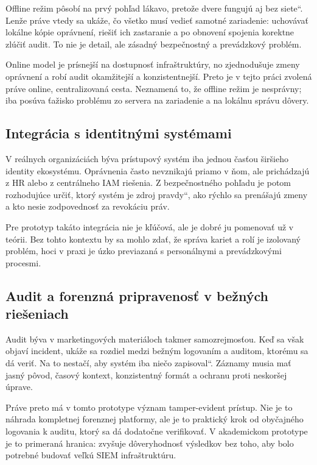 \documentclass[journal,a4paper,onecolumn]{IEEEtran}
\newcommand{\uv}[1]{\quotedblbase#1\textquotedblleft}
\begin{document}
Offline režim pôsobí na prvý pohľad lákavo, pretože dvere \uv{fungujú aj bez siete}. Lenže práve vtedy sa ukáže, čo všetko musí vedieť samotné zariadenie: uchovávať lokálne kópie oprávnení, riešiť ich zastaranie a po obnovení spojenia korektne zlúčiť audit. To nie je detail, ale zásadný bezpečnostný a prevádzkový problém.

Online model je prísnejší na dostupnosť infraštruktúry, no zjednodušuje zmeny oprávnení a robí audit okamžitejší a konzistentnejší. Preto je v tejto práci zvolená práve online, centralizovaná cesta. Neznamená to, že offline režim je nesprávny; iba posúva ťažisko problému zo servera na zariadenie a na lokálnu správu dôvery.

\subsection{Integrácia s identitnými systémami}

V reálnych organizáciách býva prístupový systém iba jednou časťou širšieho identity ekosystému. Oprávnenia často nevznikajú priamo v ňom, ale prichádzajú z HR alebo z centrálneho IAM riešenia. Z bezpečnostného pohľadu je potom rozhodujúce určiť, ktorý systém je \uv{zdroj pravdy}, ako rýchlo sa prenášajú zmeny a kto nesie zodpovednosť za revokáciu práv.

Pre prototyp takáto integrácia nie je kľúčová, ale je dobré ju pomenovať už v teórii. Bez tohto kontextu by sa mohlo zdať, že správa kariet a rolí je izolovaný problém, hoci v praxi je úzko previazaná s personálnymi a prevádzkovými procesmi.

\subsection{Audit a forenzná pripravenosť v bežných riešeniach}

Audit býva v marketingových materiáloch takmer samozrejmosťou. Keď sa však objaví incident, ukáže sa rozdiel medzi bežným logovaním a auditom, ktorému sa dá veriť. Na to nestačí, aby systém iba \uv{niečo zapisoval}. Záznamy musia mať jasný pôvod, časový kontext, konzistentný formát a ochranu proti neskoršej úprave.

Práve preto má v tomto prototype význam tamper-evident prístup. Nie je to náhrada kompletnej forenznej platformy, ale je to praktický krok od obyčajného logovania k auditu, ktorý sa dá dodatočne verifikovať. V akademickom prototype je to primeraná hranica: zvyšuje dôveryhodnosť výsledkov bez toho, aby bolo potrebné budovať veľkú SIEM infraštruktúru.
\end{document}
